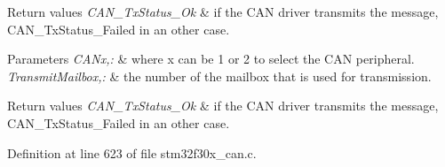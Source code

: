\begin{DoxyRetVals}{Return values}
{\em C\-A\-N\-\_\-\-Tx\-Status\-\_\-\-Ok} & if the C\-A\-N driver transmits the message, C\-A\-N\-\_\-\-Tx\-Status\-\_\-\-Failed in an other case.\\
\hline
\end{DoxyRetVals}

\begin{DoxyParams}{Parameters}
{\em C\-A\-Nx,\-:} & where x can be 1 or 2 to select the C\-A\-N peripheral. \\
\hline
{\em Transmit\-Mailbox,\-:} & the number of the mailbox that is used for transmission. \\
\hline
\end{DoxyParams}

\begin{DoxyRetVals}{Return values}
{\em C\-A\-N\-\_\-\-Tx\-Status\-\_\-\-Ok} & if the C\-A\-N driver transmits the message, C\-A\-N\-\_\-\-Tx\-Status\-\_\-\-Failed in an other case. \\
\hline
\end{DoxyRetVals}


Definition at line 623 of file stm32f30x\-\_\-can.\-c.

